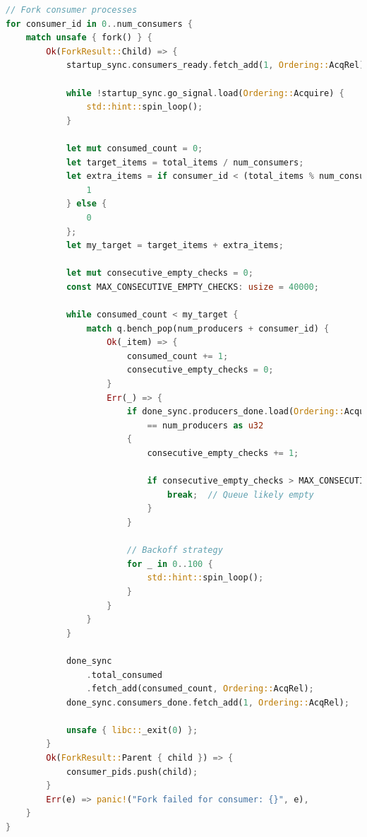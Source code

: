 \begin{lstlisting}[language=Rust, style=boxed, caption={Consumer process implementation}, label={lst:consumer-process}]
// Fork consumer processes
for consumer_id in 0..num_consumers {
    match unsafe { fork() } {
        Ok(ForkResult::Child) => {
            startup_sync.consumers_ready.fetch_add(1, Ordering::AcqRel);

            while !startup_sync.go_signal.load(Ordering::Acquire) {
                std::hint::spin_loop();
            }

            let mut consumed_count = 0;
            let target_items = total_items / num_consumers;
            let extra_items = if consumer_id < (total_items % num_consumers) {
                1
            } else {
                0
            };
            let my_target = target_items + extra_items;

            let mut consecutive_empty_checks = 0;
            const MAX_CONSECUTIVE_EMPTY_CHECKS: usize = 40000;

            while consumed_count < my_target {
                match q.bench_pop(num_producers + consumer_id) {
                    Ok(_item) => {
                        consumed_count += 1;
                        consecutive_empty_checks = 0;
                    }
                    Err(_) => {
                        if done_sync.producers_done.load(Ordering::Acquire)
                            == num_producers as u32
                        {
                            consecutive_empty_checks += 1;

                            if consecutive_empty_checks > MAX_CONSECUTIVE_EMPTY_CHECKS {
                                break;  // Queue likely empty
                            }
                        }
                        
                        // Backoff strategy
                        for _ in 0..100 {
                            std::hint::spin_loop();
                        }
                    }
                }
            }

            done_sync
                .total_consumed
                .fetch_add(consumed_count, Ordering::AcqRel);
            done_sync.consumers_done.fetch_add(1, Ordering::AcqRel);

            unsafe { libc::_exit(0) };
        }
        Ok(ForkResult::Parent { child }) => {
            consumer_pids.push(child);
        }
        Err(e) => panic!("Fork failed for consumer: {}", e),
    }
}
\end{lstlisting}

